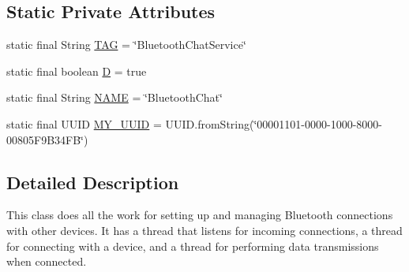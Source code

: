 \subsection*{Static Private Attributes}
\begin{DoxyCompactItemize}
\item 
static final String \hyperlink{classcom_1_1example_1_1android_1_1_bluetooth_chat_1_1_bluetooth_chat_service_a844c5efdea72aa6bf76fb98b1072572a}{T\-A\-G} = \char`\"{}Bluetooth\-Chat\-Service\char`\"{}
\item 
static final boolean \hyperlink{classcom_1_1example_1_1android_1_1_bluetooth_chat_1_1_bluetooth_chat_service_a5d04bb9010fad999fbcad7c652d6c0ce}{D} = true
\item 
static final String \hyperlink{classcom_1_1example_1_1android_1_1_bluetooth_chat_1_1_bluetooth_chat_service_a2e2a8b5e4b33363e36e2d75ff425c86c}{N\-A\-M\-E} = \char`\"{}Bluetooth\-Chat\char`\"{}
\item 
static final U\-U\-I\-D \hyperlink{classcom_1_1example_1_1android_1_1_bluetooth_chat_1_1_bluetooth_chat_service_ad6683c9b25da0fe7ea60ab048c7589cb}{M\-Y\-\_\-\-U\-U\-I\-D} = U\-U\-I\-D.\-from\-String(\char`\"{}00001101-\/0000-\/1000-\/8000-\/00805\-F9\-B34\-F\-B\char`\"{})
\end{DoxyCompactItemize}


\subsection{Detailed Description}
This class does all the work for setting up and managing Bluetooth connections with other devices. It has a thread that listens for incoming connections, a thread for connecting with a device, and a thread for performing data transmissions when connected. 

